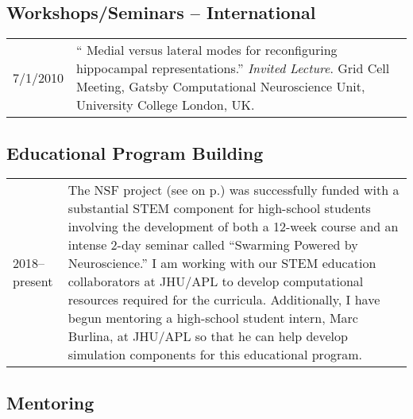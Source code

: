 \documentclass[10pt]{article}
\newcommand{\unpubtitle}[1]{{\color{hopkinsblue} #1}}
\begin{document}
\subsection*{Workshops/Seminars -- International}

\begin{tabular}{@{\hspace{0.2in}}l>{\raggedright\arraybackslash}p{}}
  7/1/2010 \hspace{0.2in} & ``\unpubtitle{Medial versus lateral modes for
  reconfiguring hippocampal representations}.'' \emph{Invited Lecture}. Grid
  Cell Meeting, Gatsby Computational Neuroscience Unit, University College
  London, UK.\\
  \end{tabular}

\smallskip
\subsection*{Educational Program Building}

\begin{tabular}{@{\hspace{0.2in}}l>{\raggedright\arraybackslash}p{}}
  2018--present \hspace{0.1in} & The NSF project (see
  \emph{\nameref{sec:cursupport}} on p.\pageref{sec:cursupport}) was
  successfully funded with a substantial STEM component for high-school students
  involving the development of both a 12-week course and an intense 2-day
  seminar called ``Swarming Powered by Neuroscience.'' I am working with our
  STEM education collaborators at JHU/APL to develop computational resources
  required for the curricula. Additionally, I have begun mentoring a high-school
  student intern, Marc Burlina, at JHU/APL so that he can help develop
  simulation components for this educational program.
\end{tabular}

\subsection*{Mentoring}
\end{document}
